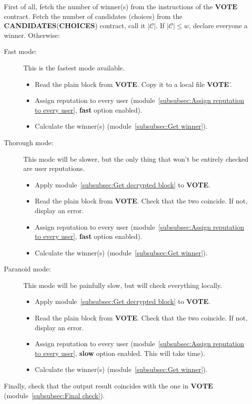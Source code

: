 \documentclass[submission, copyright,creativecommons,sharealike,noncommercial]{eptcs}
\newcommand{\candidates}{\ensuremath{\mathcal{C}} \xspace}
\newcommand{\Candidates}{\textbf{CANDIDATES}\xspace}
\newcommand{\Choices}{\textbf{CHOICES}\xspace}
\newcommand{\Vote}{\textbf{VOTE}\xspace}
\begin{document}
First of all, fetch the number of winner(s) from the instructions of the $\Vote$ contract. Fetch the number of candidates (choices) from the \Candidates (\Choices) contract, call it $|\candidates|$. If $|\candidates| \leq w$, declare everyone a winner. Otherwise: 
	\begin{description}
		\item[Fast mode:] This is the fastest mode available. 
			\begin{itemize}
				\item Read the plain block from \Vote. Copy it to a local file \Vote'.
				\item Assign reputation to every user (module~\ref{subsubsec:Assign reputation to every user}, \textbf{fast} option enabled).
				\item Calculate the winner(s) (module~\ref{subsubsec:Get winner}).
			\end{itemize}	
		\item[Thorough mode:] This mode will be slower, but the only thing that won't be entirely checked are user reputations.
			\begin{itemize}
				\item Apply module~\ref{subsubsec:Get decrypted block} to \Vote.
				\item Read the plain block from \Vote. Check that the two coincide. If not, display an error.
				\item Assign reputation to every user (module~\ref{subsubsec:Assign reputation to every user}, \textbf{fast} option enabled).
				\item Calculate the winner(s) (module~\ref{subsubsec:Get winner}).
			\end{itemize}			
		\item[Paranoid mode:] This mode will be painfully slow, but will check everything locally.
			\begin{itemize}
				\item Apply module~\ref{subsubsec:Get decrypted block} to \Vote.
				\item Read the plain block from \Vote. Check that the two coincide. If not, display an error.
				\item Assign reputation to every user (module~\ref{subsubsec:Assign reputation to every user}, \textbf{slow} option enabled. This will take time).
				\item Calculate the winner(s) (module~\ref{subsubsec:Get winner}).
			\end{itemize}			
	\end{description}
Finally, check that the output result coincides with the one in $\Vote$ (module~\ref{subsubsec:Final check}).
\end{document}
